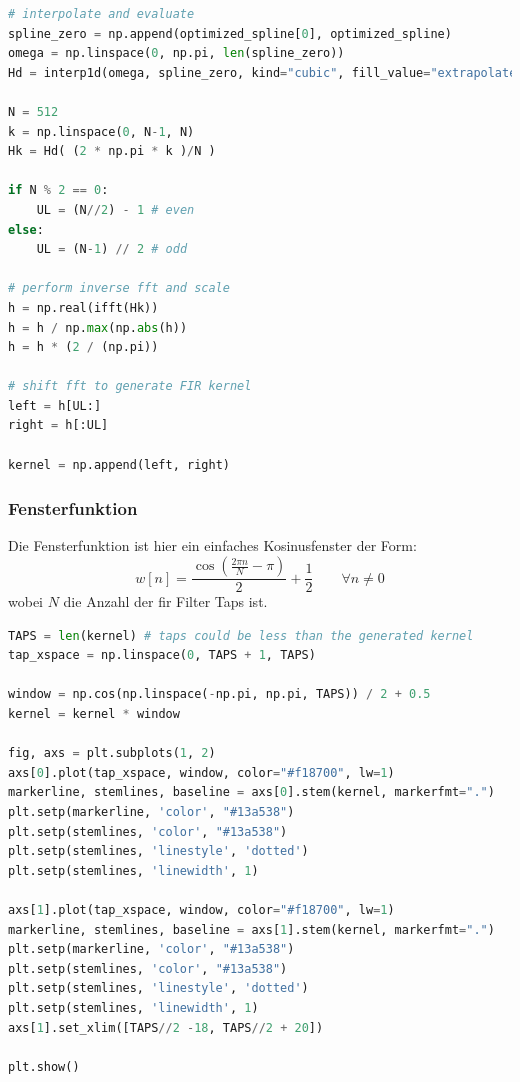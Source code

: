\begin{lstlisting}[language=Python]
# interpolate and evaluate
spline_zero = np.append(optimized_spline[0], optimized_spline)
omega = np.linspace(0, np.pi, len(spline_zero))
Hd = interp1d(omega, spline_zero, kind="cubic", fill_value="extrapolate", bounds_error=False)

N = 512
k = np.linspace(0, N-1, N)
Hk = Hd( (2 * np.pi * k )/N )

if N % 2 == 0:
    UL = (N//2) - 1 # even
else:
    UL = (N-1) // 2 # odd

# perform inverse fft and scale
h = np.real(ifft(Hk))
h = h / np.max(np.abs(h))
h = h * (2 / (np.pi))

# shift fft to generate FIR kernel
left = h[UL:]
right = h[:UL]

kernel = np.append(left, right)
\end{lstlisting}

\hypertarget{fensterfunktion}{%
\subsubsection{Fensterfunktion}\label{fensterfunktion}}

Die Fensterfunktion ist hier ein einfaches Kosinusfenster der Form:
\[w[n] = \frac{\cos \left( \frac{2\pi n}{N}-\pi \right)}{2} + \frac{1}{2} \qquad \forall n \neq 0\]
wobei \(N\) die Anzahl der \gls{fir} Filter Taps ist.

\begin{lstlisting}[language=Python]
TAPS = len(kernel) # taps could be less than the generated kernel
tap_xspace = np.linspace(0, TAPS + 1, TAPS)

window = np.cos(np.linspace(-np.pi, np.pi, TAPS)) / 2 + 0.5
kernel = kernel * window

fig, axs = plt.subplots(1, 2)
axs[0].plot(tap_xspace, window, color="#f18700", lw=1)
markerline, stemlines, baseline = axs[0].stem(kernel, markerfmt=".")
plt.setp(markerline, 'color', "#13a538")
plt.setp(stemlines, 'color', "#13a538")
plt.setp(stemlines, 'linestyle', 'dotted')
plt.setp(stemlines, 'linewidth', 1)

axs[1].plot(tap_xspace, window, color="#f18700", lw=1)
markerline, stemlines, baseline = axs[1].stem(kernel, markerfmt=".")
plt.setp(markerline, 'color', "#13a538")
plt.setp(stemlines, 'color', "#13a538")
plt.setp(stemlines, 'linestyle', 'dotted')
plt.setp(stemlines, 'linewidth', 1)
axs[1].set_xlim([TAPS//2 -18, TAPS//2 + 20])

plt.show()
\end{lstlisting}

